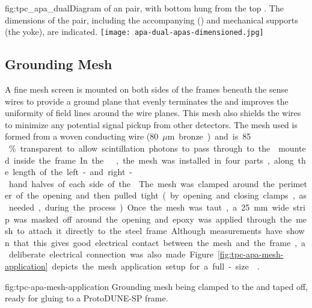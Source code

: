 \begin{dunefigure}{fig:tpc_apa_dual}{Diagram of an  pair, with bottom  hung from the top . The dimensions of the  pair, including the accompanying  () and mechanical supports (the yoke), are indicated.}
\texttt{[image: apa-dual-apas-dimensioned.jpg]} 
\end{dunefigure}


\subsection{Grounding Mesh}
\label{sec:fdsp-apa-mesh}

A fine mesh screen is mounted on both sides of the frames beneath the sense wires to provide a ground plane that evenly terminates the \efield and improves the uniformity of field lines around the wire planes.  This mesh also shields the wires to minimize any potential signal pickup from other detectors.  The mesh used is formed from a %
woven conducting wire (\SI{80}{$\mu$m} bronze) and is \num{85}\,\% transparent to allow scintillation photons to pass through to the  mounted inside the frame. 

In the  , the mesh was installed in four parts, along the length of the left- and right-hand halves of each side of the . The mesh was clamped around the perimeter of the opening and then pulled tight (by opening and closing clamps, as needed, during the process).  Once the mesh was taut, a \SI{25}{mm} wide strip was masked off around the opening and epoxy was applied through the mesh to attach it directly to the steel frame.  Although measurements have shown that this gives good electrical contact between the mesh and the frame, a deliberate electrical connection was also made.  Figure~\ref{fig:tpc-apa-mesh-application} depicts the mesh application setup for a full-size  .

\begin{dunefigure}{fig:tpc-apa-mesh-application}
{Grounding mesh being clamped to the  and taped off, ready for gluing to a ProtoDUNE-SP frame.}
\setlength{\fboxsep}{0pt}
\setlength{\fboxrule}{0.5pt}
 \quad
{}
\end{dunefigure}

